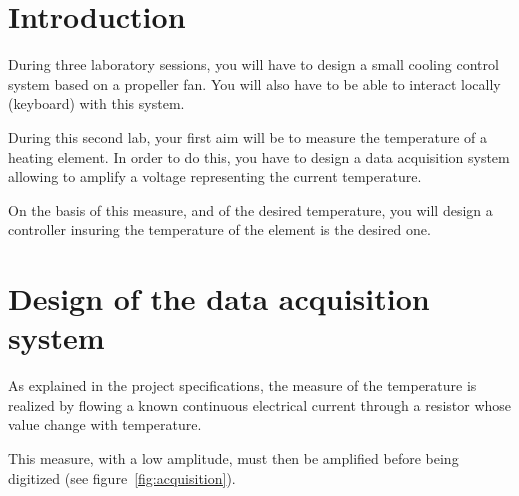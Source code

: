 \documentclass[11pt,a4paper]{article}
\theoremstyle{definition}%
\begin{document}
\section{Introduction}
During three laboratory sessions, you will have to design a small cooling control system based on a propeller fan.
You will also have to be able to interact locally (keyboard) with this system.

During this second lab, your first aim will be to measure the temperature of a heating element.
In order to do this, you have to design a data acquisition system allowing to amplify a voltage representing the current temperature.

On the basis of this measure, and of the desired temperature, you will design a controller insuring the temperature of the element is the desired one.









\section{Design of the data acquisition system}
As explained in the project specifications, the measure of the temperature is realized by flowing a known continuous electrical current through a resistor whose value change with temperature.

This measure, with a low amplitude, must then be amplified before being digitized (see figure~\ref{fig:acquisition}).
\end{document}
